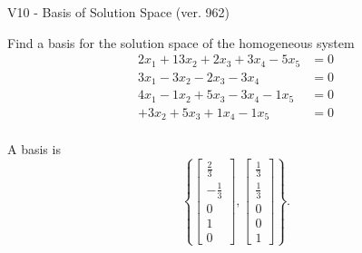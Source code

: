 \begin{exercise}
  \begin{exerciseTitle}V10 - Basis of Solution Space (ver. 962)\end{exerciseTitle}
  \begin{exerciseStatement}
    Find a basis for the solution space of the homogeneous system 
\begin{align*}
 2 x_ 1 + 13 x_ 2 + 2 x_ 3 + 3 x_ 4 -5 x_ 5 &= 0  \\ 
  3 x_ 1 -3 x_ 2 -2 x_ 3 -3 x_ 4 &= 0  \\ 
  4 x_ 1 -1 x_ 2 + 5 x_ 3 -3 x_ 4 -1 x_ 5 &= 0  \\ 
  + 3 x_ 2 + 5 x_ 3 + 1 x_ 4 -1 x_ 5 &= 0  \\ 
 \end{align*}


 
  \end{exerciseStatement}

  \begin{exerciseAnswer}
   A basis is   
\[\left\{\left[\begin{array}{c}
\frac{2}{3} \\
-\frac{1}{3} \\
0 \\
1 \\
0
\end{array}\right] , \left[\begin{array}{c}
\frac{1}{3} \\
\frac{1}{3} \\
0 \\
0 \\
1
\end{array}\right]\right\}.\]

  


  \end{exerciseAnswer}
\end{exercise}